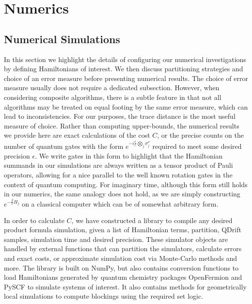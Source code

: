
\newcommand{\fidel}{\mathscr{F}}
\newcommand{\tracedist}{\mathscr{T}}
\newcommand{\trotterchan}[2]{{S_{#1}{\parens{ #2 }}}}
\newcommand{\tschan}[2]{\mathcal{T}^{#1}{( #2 )}}
    
\newcommand{\achan}[1]{\mathcal{T}_{A}^{2k}{( #1 )}}
\newcommand{\bchan}[1]{\mathcal{Q}_{B}{( #1 )}}
 
\newcommand{\evolchan}[1]{\mathcal{U}{ ( #1 ) }}
\newcommand{\specnorm}[1]{\left| \left| #1 \right| \right|_\infty}
\newcommand{\liouv}{\mathcal{L}}
\newcommand{\prodform}{S_{2k}}
\newcommand{\indone}[1]{\norm{ #1 }_{1\rightarrow 1}}
\newcommand{\indonedef}[1]{\max_{\rho : \norm{\rho}=1} \norm{ #1 }_1}
    


\chapter{Numerics}


\section{Numerical Simulations} \label{sec:numerical_sim}
In this section we highlight the details of configuring our numerical investigations by defining Hamiltonians of interest. We then discuss partitioning strategies and choice of an error measure before presenting numerical results. The choice of error measure usually does not require a dedicated subsection. However, when considering composite algorithms, there is a subtle feature in that not all algorithms may be treated on equal footing by the same error measure, which can lead to inconsistencies. For our purposes, the trace distance is the most useful measure of choice. Rather than computing upper-bounds, the numerical results we provide here are exact calculations of the cost $C$, or the precise counts on the number of quantum gates with the form $e^{-i\frac{t}{r} \bigotimes_j \sigma_j^\nu}$ required to meet some desired precision $\epsilon$. We write gates in this form to highlight that the Hamiltonian summands in our simulations are always written as a tensor product of Pauli operators, allowing for a nice parallel to the well known rotation gates in the context of quantum computing. For imaginary time, although this form still holds in our numerics, the same analogy does not hold, as we are simply constructing $e^{-\frac{\beta}{r} H_j}$ on a classical computer which can be of somewhat arbitrary form. 

In order to calculate $C$, we have constructed a library to compile any desired product formula simulation, given a list of Hamiltonian terms, partition, QDrift samples, simulation time and desired precision. These simulator objects are handled by external functions that can partition the simulators, calculate errors and exact costs, or approximate simulation cost via Monte-Carlo methods and more. The library is built on NumPy, but also contains conversion functions to load Hamiltonians generated by quantum chemistry packages OpenFermion \cite{mcclean2020openfermion} and PySCF \cite{sun2018pyscf} to simulate systems of interest. It also contains methods for geometrically local simulations to compute blockings using the required set logic.

